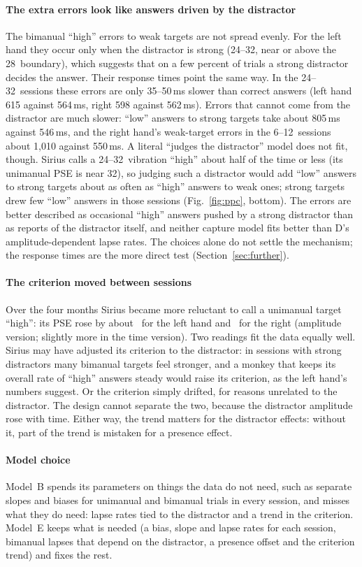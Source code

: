 \paragraph{The extra errors look like answers driven by the distractor}
The bimanual ``high'' errors to weak targets are not spread evenly.
For the left hand they occur only when the distractor is strong (24--32\um, near or above the 28\um\ boundary), which suggests that on a few percent of trials a strong distractor decides the answer.
Their response times point the same way.
In the 24--32\um\ sessions these errors are only 35--50\,ms slower than correct answers (left hand 615 against 564\,ms, right 598 against 562\,ms).
Errors that cannot come from the distractor are much slower: ``low'' answers to strong targets take about 805\,ms against 546\,ms, and the right hand's weak-target errors in the 6--12\um\ sessions about 1,010 against 550\,ms.
A literal ``judges the distractor'' model does not fit, though. Sirius calls a 24--32\um\ vibration ``high'' about half of the time or less (its unimanual PSE is near 32\um), so judging such a distractor would add ``low'' answers to strong targets about as often as ``high'' answers to weak ones; strong targets drew few ``low'' answers in those sessions (Fig.~\ref{fig:ppc}, bottom). The errors are better described as occasional ``high'' answers pushed by a strong distractor than as reports of the distractor itself, and neither capture model fits better than D's amplitude-dependent lapse rates. The choices alone do not settle the mechanism; the response times are the more direct test (Section~\ref{sec:further}).

\paragraph{The criterion moved between sessions}
Over the four months Sirius became more reluctant to call a unimanual target ``high'': its PSE rose by about \critPseLeft\um\ for the left hand and \critPseRight\um\ for the right (amplitude version; slightly more in the time version).
Two readings fit the data equally well.
Sirius may have adjusted its criterion to the distractor: in sessions with strong distractors many bimanual targets feel stronger, and a monkey that keeps its overall rate of ``high'' answers steady would raise its criterion, as the left hand's numbers suggest.
Or the criterion simply drifted, for reasons unrelated to the distractor.
The design cannot separate the two, because the distractor amplitude rose with time.
Either way, the trend matters for the distractor effects: without it, part of the trend is mistaken for a presence effect.

\paragraph{Model choice}
Model~B spends its parameters on things the data do not need, such as separate slopes and biases for unimanual and bimanual trials in every session, and misses what they do need: lapse rates tied to the distractor and a trend in the criterion.
Model~E keeps what is needed (a bias, slope and lapse rates for each session, bimanual lapses that depend on the distractor, a presence offset and the criterion trend) and fixes the rest.
